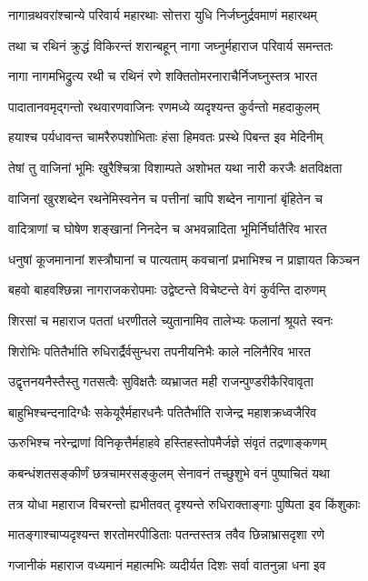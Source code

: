 \twolineshloka
{नागान्रथवरांश्चान्ये परिवार्य महारथाः}
{सोत्तरा युधि निर्जघ्नुर्द्रवमाणं महारथम्}


\twolineshloka
{तथा च रथिनं क्रुद्धं विकिरन्तं शरान्बहून्}
{नागा जघ्नुर्महाराज परिवार्य समन्ततः}


\twolineshloka
{नागा नागमभिद्रुत्य रथी च रथिनं रणे}
{शक्तितोमरनाराचैर्निजघ्नुस्तत्र भारत}


\twolineshloka
{पादातानवमृद्गन्तो रथवारणवाजिनः}
{रणमध्ये व्यदृश्यन्त कुर्वन्तो महदाकुलम्}


\twolineshloka
{हयाश्च पर्यधावन्त चामरैरुपशोभिताः}
{हंसा हिमवतः प्रस्थे पिबन्त इव मेदिनीम्}


\twolineshloka
{तेषां तु वाजिनां भूमिः खुरैश्चित्रा विशाम्पते}
{अशोभत यथा नारी करजैः क्षतविक्षता}


\twolineshloka
{वाजिनां खुरशब्देन रथनेमिस्वनेन च}
{पत्तीनां चापि शब्देन नागानां बृंहितेन च}


\twolineshloka
{वादित्राणां च घोषेण शङ्खानां निनदेन च}
{अभवन्नादिता भूमिर्निर्घातैरिव भारत}


\twolineshloka
{धनुषां कूजमानानां शस्त्रौघानां च पात्यताम्}
{कवचानां प्रभाभिश्च न प्राज्ञायत किञ्चन}


\twolineshloka
{बहवो बाहवश्छिन्ना नागराजकरोपमाः}
{उद्वेष्टन्ते विचेष्टन्ते वेगं कुर्वन्ति दारुणम्}


\twolineshloka
{शिरसां च महाराज पततां धरणीतले}
{च्युतानामिव तालेभ्यः फलानां श्रूयते स्वनः}


\twolineshloka
{शिरोभिः पतितैर्भाति रुधिरार्द्रैर्वसुन्धरा}
{तपनीयनिभैः काले नलिनैरिव भारत}


\twolineshloka
{उद्वृत्तनयनैस्तैस्तु गतसत्वैः सुविक्षतैः}
{व्यभ्राजत मही राजन्पुण्डरीकैरिवावृता}


\twolineshloka
{बाहुभिश्चन्दनादिग्धैः सकेयूरैर्महारधनैः}
{पतितैर्भाति राजेन्द्र महाशक्रध्वजैरिव}


\twolineshloka
{ऊरुभिश्च नरेन्द्राणां विनिकृत्तैर्महाहवे}
{हस्तिहस्तोपमैर्जज्ञे संवृतं तद्रणाङ्कणम्}


\twolineshloka
{कबन्धंशतसङ्कीर्णं छत्रचामरसङ्कुलम्}
{सेनावनं तच्छुशुभे वनं पुष्पाचितं यथा}


\twolineshloka
{तत्र योधा महाराज विचरन्तो ह्यभीतवत्}
{दृश्यन्ते रुधिराक्ताङ्गाः पुष्पिता इव किंशुकाः}


\twolineshloka
{मातङ्गाश्चाप्यदृश्यन्त शरतोमरपीडिताः}
{पतन्तस्तत्र तवैव छिन्नाभ्रासदृशा रणे}


\twolineshloka
{गजानीकं महाराज वध्यमानं महात्मभिः}
{व्यदीर्यत दिशः सर्वा वातनुन्ना धना इव}


